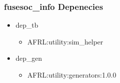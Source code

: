 \subsubsection{fusesoc\_info Depenecies}
\begin{itemize}
\item dep\_tb
	\begin{itemize}
	\item AFRL:utility:sim\_helper
	\end{itemize}
\item dep\_gen
	\begin{itemize}
	\item AFRL:utility:generators:1.0.0
	\end{itemize}
\end{itemize}
